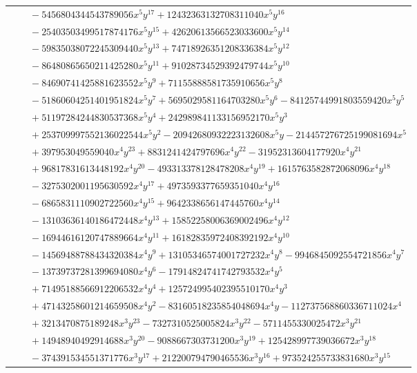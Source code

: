 \documentclass[11pt]{article}
\begin{document}
\begin{longtable}{@{}ll@{}}
 & $\quad -5456804344543789056x^{5}y^{17}+12432363132708311040x^{5}y^{16}$\\
 & $\quad -25403503499517874176x^{5}y^{15}+42620613566523033600x^{5}y^{14}$\\
 & $\quad -59835038072245309440x^{5}y^{13}+74718926351208336384x^{5}y^{12}$\\
 & $\quad -86480865650211425280x^{5}y^{11}+91028734529392479744x^{5}y^{10}$\\
 & $\quad -84690741425881623552x^{5}y^{9}+71155888581735910656x^{5}y^{8}$\\
 & $\quad -51860604251401951824x^{5}y^{7}+5695029581164703280x^{5}y^{6}-84125744991803559420x^{5}y^{5}$\\
 & $\quad +51197284244830537368x^{5}y^{4}+242989841133156952170x^{5}y^{3}$\\
 & $\quad +253709997552136022544x^{5}y^{2}-20942680932223132608x^{5}y-214457276725199081694x^{5}$\\
 & $\quad +397953049559040x^{4}y^{23}+8831241424797696x^{4}y^{22}-31952313604177920x^{4}y^{21}$\\
 & $\quad +96817831613448192x^{4}y^{20}-493313378128478208x^{4}y^{19}+1615763582872068096x^{4}y^{18}$\\
 & $\quad -3275302001195630592x^{4}y^{17}+4973593377659351040x^{4}y^{16}$\\
 & $\quad -6865831110902722560x^{4}y^{15}+9642338656147445760x^{4}y^{14}$\\
 & $\quad -13103636140186472448x^{4}y^{13}+15852258006369002496x^{4}y^{12}$\\
 & $\quad -16944616120747889664x^{4}y^{11}+16182835972408392192x^{4}y^{10}$\\
 & $\quad -14569488788434320384x^{4}y^{9}+13105346574001727232x^{4}y^{8}-9946845092554721856x^{4}y^{7}$\\
 & $\quad -13739737281399694080x^{4}y^{6}-17914824741742793532x^{4}y^{5}$\\
 & $\quad +71495188566912206532x^{4}y^{4}+125724995402395510170x^{4}y^{3}$\\
 & $\quad +47143258601214659508x^{4}y^{2}-83160518235854048694x^{4}y-112737568860336711024x^{4}$\\
 & $\quad +3213470875189248x^{3}y^{23}-7327310525005824x^{3}y^{22}-5711455330025472x^{3}y^{21}$\\
 & $\quad +14948940492914688x^{3}y^{20}-9088667303731200x^{3}y^{19}+125428997739036672x^{3}y^{18}$\\
 & $\quad -374391534551371776x^{3}y^{17}+212200794790465536x^{3}y^{16}+973524255733831680x^{3}y^{15}$\\

\end{longtable}
\end{document}
